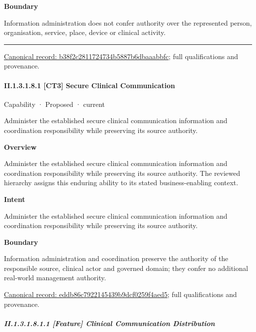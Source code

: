 \textbf{Boundary}



Information administration does not confer authority over the represented person, organisation, service, place, device or clinical activity.



\medskip\hrule\medskip

{\footnotesize \href{../../../../continuum/strategy/capability/b38f2c2811724734b5887b6dbaaabbfc.md}{Canonical record: b38f2c2811724734b5887b6dbaaabbfc}; full qualifications and provenance.}\par
\paragraph*{II.1.3.1.8.1 [CT3] Secure Clinical Communication}
\label{navigation:II.1.3.1.8.1}

\label{element:eddb86c7922145439b9dcf0259f4aed5}
{\small Capability · Proposed · current}\par

Administer the established secure clinical communication information and coordination responsibility while preserving its source authority.



\textbf{Overview}



Administer the established secure clinical communication information and coordination responsibility while preserving its source authority. The reviewed hierarchy assigns this enduring ability to its stated business-enabling context.



\textbf{Intent}



Administer the established secure clinical communication information and coordination responsibility while preserving its source authority.



\textbf{Boundary}



Information administration and coordination preserve the authority of the responsible source, clinical actor and governed domain; they confer no additional real-world management authority.


{\footnotesize \href{../../../../continuum/strategy/capability/eddb86c7922145439b9dcf0259f4aed5.md}{Canonical record: eddb86c7922145439b9dcf0259f4aed5}; full qualifications and provenance.}\par
\subparagraph*{II.1.3.1.8.1.1 [Feature] Clinical Communication Distribution}
\label{navigation:II.1.3.1.8.1.1}

